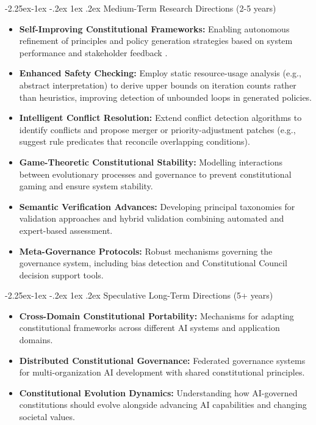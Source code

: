 \documentclass[manuscript,screen,review,anonymous,9pt]{acmart}
\makeatletter
\renewcommand\subsection{\@startsection{subsection}{2}{\z@}%
  {-2.25ex\@plus -1ex \@minus -.2ex}%
  {1ex \@plus .2ex}%
  {\normalfont\large\bfseries}}
\makeatother
\begin{document}
\subsection{Medium-Term Research Directions (2-5 years)}
\label{subsec:medium_term_research}
\begin{itemize}
	\item \textbf{Self-Improving Constitutional Frameworks:} Enabling autonomous refinement of principles and policy generation strategies based on system performance and stakeholder feedback \cite{Zhao2025AbsoluteZero}.
	\item \textbf{Enhanced Safety Checking:} Employ static resource-usage analysis (e.g., abstract interpretation) to derive upper bounds on iteration counts rather than heuristics, improving detection of unbounded loops in generated policies.
	\item \textbf{Intelligent Conflict Resolution:} Extend conflict detection algorithms to identify conflicts and propose merger or priority-adjustment patches (e.g., suggest rule predicates that reconcile overlapping conditions).
	\item \textbf{Game-Theoretic Constitutional Stability:} Modelling interactions between evolutionary processes and governance to prevent constitutional gaming and ensure system stability.
	\item \textbf{Semantic Verification Advances:} Developing principal taxonomies for validation approaches and hybrid validation combining automated and expert-based assessment.
	\item \textbf{Meta-Governance Protocols:} Robust mechanisms governing the governance system, including bias detection and Constitutional Council decision support tools.
\end{itemize}

\subsection{Speculative Long-Term Directions (5+ years)}
\begin{itemize}
	\item \textbf{Cross-Domain Constitutional Portability:} Mechanisms for adapting constitutional frameworks across different AI systems and application domains.
	\item \textbf{Distributed Constitutional Governance:} Federated governance systems for multi-organization AI development with shared constitutional principles.
	\item \textbf{Constitutional Evolution Dynamics:} Understanding how AI-governed constitutions should evolve alongside advancing AI capabilities and changing societal values.
\end{itemize}
\end{document}
